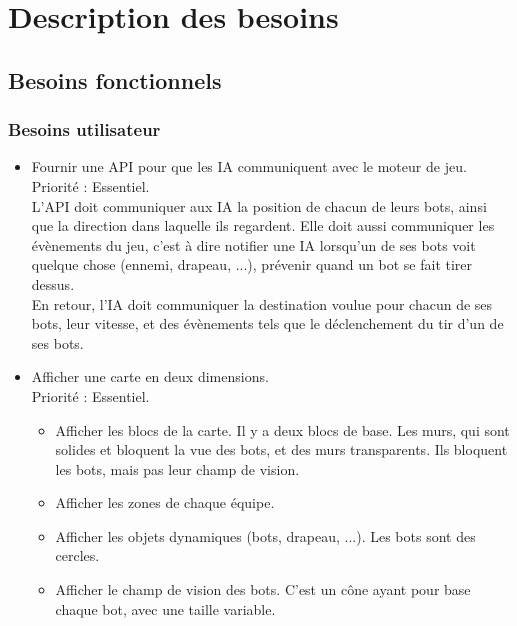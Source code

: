 \section{Description des besoins}

\subsection{Besoins fonctionnels}
\subsubsection{Besoins utilisateur}
    \begin{itemize}
        \item Fournir une API pour que les IA communiquent avec le moteur de jeu. \\
                Priorité : Essentiel.\\
                L'API doit communiquer aux IA la position de chacun de leurs bots, ainsi que la direction dans laquelle ils regardent. Elle doit aussi communiquer les évènements du jeu, c'est à dire notifier une IA lorsqu'un de ses bots voit quelque chose (ennemi, drapeau, ...), prévenir quand un bot se fait tirer dessus.\\
                En retour, l'IA doit communiquer la destination voulue pour chacun de ses bots, leur vitesse, et des évènements tels que le déclenchement du tir d'un de ses bots.\\
                

        \item Afficher une carte en deux dimensions. \\
            Priorité : Essentiel.
            \begin{itemize}
                \item Afficher les blocs de la carte. Il y a deux blocs de base. Les murs, qui sont solides et bloquent la vue des bots, et des murs transparents. Ils bloquent les bots, mais pas leur champ de vision.
                \item Afficher les zones de chaque équipe.
                \item Afficher les objets dynamiques (bots, drapeau, ...). Les bots sont des cercles.
                \item Afficher le champ de vision des bots. C'est un cône ayant pour base chaque bot, avec une taille variable. \\
            \end{itemize}
            

\end{itemize}
